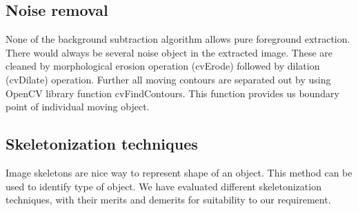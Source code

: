\subsection{Noise removal}
\indent None of the background subtraction algorithm allows pure
foreground extraction. There would always be several noise object in the
extracted image. These are cleaned by morphological erosion operation
(cvErode) followed by dilation (cvDilate) operation. Further all moving
contours are separated out by using OpenCV library function
cvFindContours. This function provides us boundary point of individual
moving object.
\subsection{Skeletonization techniques}
\indent Image skeletons are nice way to represent shape of an object.
This method can be used to identify type of object. We have evaluated
different skeletonization techniques, with their merits and demerits for
suitability to our requirement.
